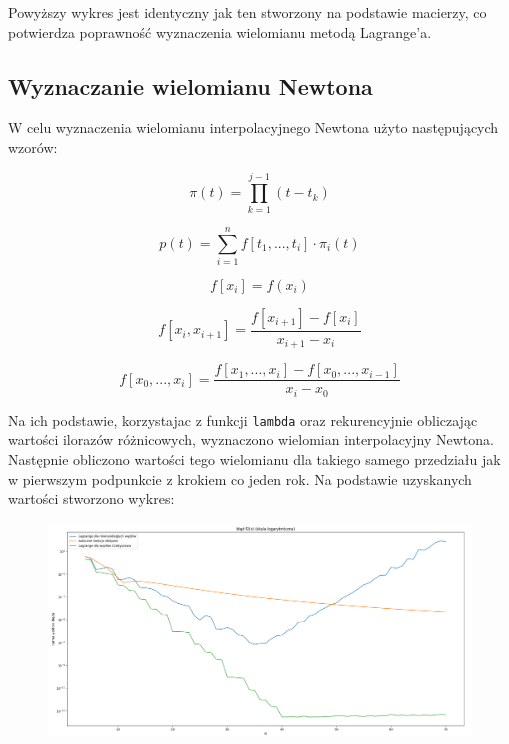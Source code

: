\documentclass{article}
\begin{document}
	Powyższy wykres jest identyczny jak ten stworzony na podstawie macierzy, co potwierdza poprawność wyznaczenia wielomianu metodą Lagrange'a.
	
	
	\subsection*{Wyznaczanie wielomianu Newtona}
	
	W celu wyznaczenia wielomianu interpolacyjnego Newtona użyto następujących wzorów:
	
	\begin{equation}
		\pi (t) = \prod _{k=1} ^ {j-1} (t-t_k)
	\end{equation}
	
	\begin{equation}
		p (t) = \sum _{i=1} ^n f[t_1,...,t_i] \cdot \pi_i(t)
	\end{equation}
	
	\begin{equation}
		f[x_i] = f(x_i)
	\end{equation}
	
	\begin{equation}
		f[x_i, x_{i+1}] = \frac{f[x_{i+1}]-f[x_{i}]}{x_{i+1} - x_{i}}
	\end{equation}
	
	\begin{equation}
		f[x_0, ..., x_i] = \frac{f[x_1, ..., x_i] - f[x_0,...,x_{i-1}]}{x_i - x_0}
	\end{equation}
	
	Na ich podstawie, korzystajac z funkcji \texttt{lambda} oraz rekurencyjnie obliczając wartości ilorazów różnicowych, wyznaczono wielomian interpolacyjny Newtona. Następnie obliczono wartości tego wielomianu dla takiego samego przedziału jak w pierwszym podpunkcie z krokiem co jeden rok. Na podstawie uzyskanych wartości stworzono wykres:
	
	\newpage
	
	\begin{figure}[h]
    		\centering
  		\includegraphics[scale = 0.9]{wykres3.png}
	\end{figure}
	
\end{document}

